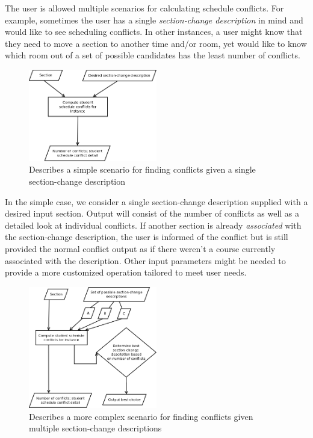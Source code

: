 \documentclass[11pt]{article}
\begin{document}
The user is allowed multiple scenarios for calculating schedule conflicts. For example, sometimes the user has a single
\textit{section-change description} in mind and would like to see scheduling conflicts. In other instances, a user might
know that they need to move a section to another time and/or room, yet would like to know which room out of a set of possible
candidates has the least number of conflicts.
\vspace{.2in}

\begin{figure}[h]
  \centering
  \includegraphics[width=0.5\textwidth]{diagrams/scenarioA.png}
  \caption{Describes a simple scenario for finding conflicts given a single section-change description}
\end{figure}

In the simple case, we consider a single section-change description supplied with a desired input section. Output will consist of the
number of conflicts as well as a detailed look at individual conflicts. If another section is already \textit{associated} with the
section-change description, the user is informed of the conflict but is still provided the normal conflict output as if there weren't
a course currently associated with the description. Other input parameters might be needed to provide a more customized operation tailored
to meet user needs.

\begin{figure}[h]
  \centering
  \includegraphics[width=0.5\textwidth]{diagrams/scenarioB.png}
  \caption{Describes a more complex scenario for finding conflicts given multiple section-change descriptions}
\end{figure}
\end{document}
